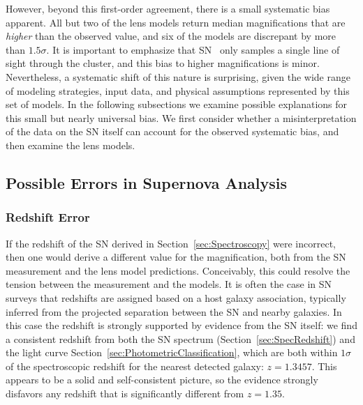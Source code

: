 
However, beyond this first-order agreement, there is a small
systematic bias apparent. All but two of the lens models return median
magnifications that are {\it higher} than the observed value, and six
of the models are discrepant by more than $1.5\sigma$.   It is important to emphasize that SN \tomas\
only samples a single line of sight through the cluster, and this bias
to higher magnifications is minor.  Nevertheless, a systematic shift
of this nature is surprising, given the wide range of modeling
strategies, input data, and physical assumptions represented by this
set of models.  In the following subsections we examine possible
explanations for this small but nearly universal bias.  We first
consider whether a misinterpretation of the data on the SN itself can
account for the observed systematic bias, and then examine the lens
models.

\subsection{Possible Errors in Supernova Analysis}
\label{sec:SupernovaError}

\subsubsection{Redshift Error}
\label{sec:RedshiftError}

If the redshift of the SN derived in Section~\ref{sec:Spectroscopy}
were incorrect, then one would derive a different value for the
magnification, both from the SN measurement and the lens model
predictions.  Conceivably, this could resolve the tension between the
measurement and the models.  It is often the case in SN surveys that
redshifts are assigned based on a host galaxy association, typically
inferred from the projected separation between the SN and nearby
galaxies.  In this case the redshift is strongly supported by
evidence from the SN
itself: we find a consistent redshift from both the SN spectrum
(Section~\ref{sec:SpecRedshift}) and the light curve
Section~\ref{sec:PhotometricClassification}, which are both within
$1\sigma$ of the spectroscopic redshift for the nearest detected
galaxy: $z=1.3457$. This appears to be a solid and self-consistent
picture, so the evidence strongly disfavors any redshift that is
significantly different from $z=1.35$.

